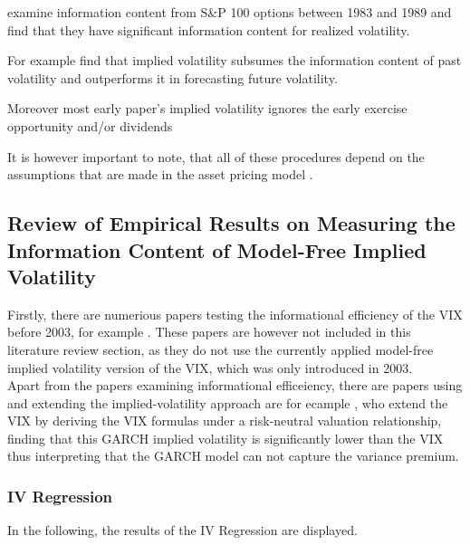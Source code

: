\textcite{day1992} examine information content from S\&P 100 options between 1983 and 1989 and find that they have significant information content for realized volatility.

For example \textcite{christensen1998} find that implied volatility subsumes the information content of past volatility and outperforms it in forecasting future volatility. 

Moreover most early paper's implied volatility ignores the early exercise opportunity and/or dividends \parencite{blair2001}

It is however important to note, that all of these procedures depend on the assumptions that are made in the asset pricing model \parencite{andersen2001}.

\subsection{Review of Empirical Results on Measuring the Information Content of Model-Free Implied Volatility}\label{sec:31LiteratureResults}

Firstly, there are numerious papers testing the informational efficiency of the VIX before 2003, for example \textcite{blair2001}. These papers are however not included in this literature review section, as they do not use the currently applied model-free implied volatility version of the VIX, which was only introduced in 2003. \\

Apart from the papers examining informational efficeiency, there are  papers using and extending the implied-volatility approach are for ecample \textcite{hao2013}, who extend the VIX by deriving the VIX formulas under a risk-neutral valuation relationship, finding that this GARCH implied volatility is significantly lower than the VIX thus interpreting that the GARCH model can not capture the variance premium. \\


\subsubsection{IV Regression}
In the following, the results of the IV Regression are displayed.

